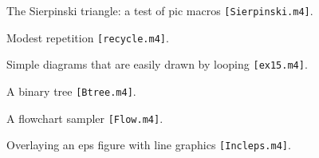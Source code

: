 \documentclass[11pt]{article}
\newcommand{\src}[1]{{\tt [#1]}}
\newcommand{\makepic}{\box\graph} %
\begin{document}
  \begin{figure}[h!t]
    \centerline{ \makepic}
    \caption{The Sierpinski triangle: a test of pic macros
    \src{Sierpinski.m4}.}
  \end{figure}

  \begin{figure}[h!t]
    \centerline{ \makepic}
    \caption{Modest repetition
    \src{recycle.m4}.}
  \end{figure}

  \begin{figure}[h!t]
    \centerline{ \makepic}
    \caption{Simple diagrams that are easily drawn by looping
    \src{ex15.m4}.}
   \end{figure}

  \begin{figure}[h!t]
    \centerline{ \makepic}
    \caption{A binary tree
    \src{Btree.m4}.}
  \end{figure}

  \begin{figure}[h!t]
    \centerline{ \makepic}
    \caption{A flowchart sampler
    \src{Flow.m4}.}
  \end{figure}

 \begin{figure}[h!t]
   \centerline{ \makepic}
   \caption{Overlaying an eps figure with line graphics
   \src{Incleps.m4}.}
 \end{figure}
\end{document}
